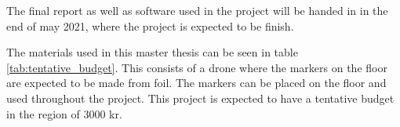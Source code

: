 \documentclass[../Head/Report.tex]{subfiles}
\begin{document}
The final report as well as software used in the project will be handed in in the end of may 2021, where the project is expected to be finish.  

The materials used in this master thesis can be seen in table \ref{tab:tentative_budget}. This consists of a drone where the markers on the floor are expected to be made from foil. The markers can be placed on the floor and used throughout the project. This project is expected to have a tentative budget in the region of 3000 kr.    

\begin{table}[H]
\captionsetup{justification=centering}
\caption{Tentative budget for the master project is set to be approximately 3000 kr. The used materials and prize can be seen in the table}
\label{tab:tentative_budget}
                \centering
\end{table}
\end{document}
